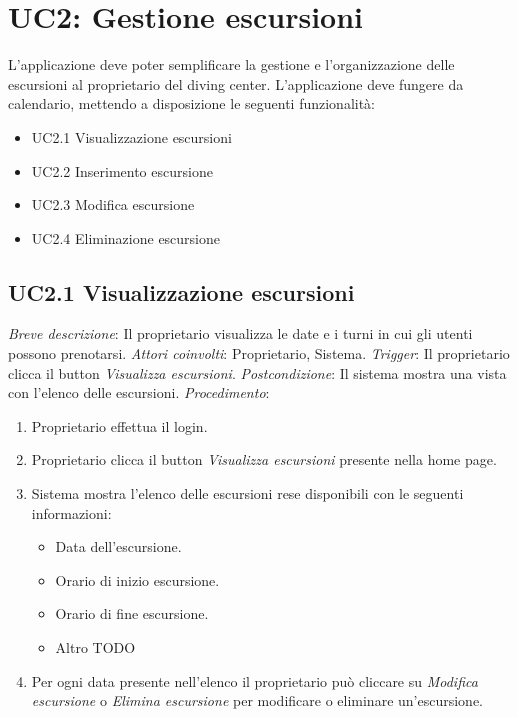 \section{UC2: Gestione escursioni}
L'applicazione deve poter semplificare la gestione e l'organizzazione delle escursioni al proprietario del diving center.
L'applicazione deve fungere da calendario, mettendo a disposizione le seguenti funzionalità:

\begin{itemize}
    \item UC2.1 Visualizzazione escursioni
    \item UC2.2 Inserimento escursione
    \item UC2.3 Modifica escursione
    \item UC2.4 Eliminazione escursione
\end{itemize}

\subsection{UC2.1 Visualizzazione escursioni}

\noindent \emph{Breve descrizione}: Il proprietario visualizza le date e i turni in cui gli utenti possono prenotarsi.\medbreak
\noindent \emph{Attori coinvolti}: Proprietario, Sistema.\medbreak
\noindent \emph{Trigger}: Il proprietario clicca il button \textit{Visualizza escursioni}.\medbreak
\noindent \emph{Postcondizione}: Il sistema mostra una vista con l'elenco delle escursioni.\medbreak
\noindent \emph{Procedimento}:

\begin{enumerate}
    \item Proprietario effettua il login.
    \item Proprietario clicca il button \textit{Visualizza escursioni} presente nella home page.
    \item Sistema mostra l'elenco delle escursioni rese disponibili con le seguenti informazioni:
          \begin{itemize}
              \item Data dell'escursione.
              \item Orario di inizio escursione.
              \item Orario di fine escursione.
              \item Altro TODO
          \end{itemize}
    \item Per ogni data presente nell'elenco il proprietario può cliccare su \textit{Modifica escursione} o \textit{Elimina escursione} per modificare o eliminare un'escursione.
\end{enumerate}

